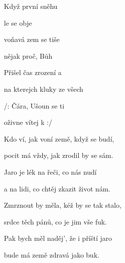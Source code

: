 

\zs
Když první   sněhu 

 le se  obje

voňavá zem se  tiše 

 nějak   proč, Bůh 
\ks



\zr
Přišel čas  {zroz}ení a 

na kterejch  {klu}ky ze všech 

/:   Čára, Ušoun se ti 

oživne   vítej k  :/
\kr

\zs
Kdo ví, jak voní země, když se budí,

pocit má vždy, jak zrodil by se sám.

Jaro je lék na řeči, co nás nudí

a na lidi, co chtěj zkazit život nám.
\ks


\zr \kr


\zs
Zmrznout by měla, kéž by se tak stalo,

srdce těch pánů, co je jim vše fuk.

Pak bych měl naděj', že i příští jaro

bude má země zdravá jako buk.
\ks

\zr \kr

\kp







